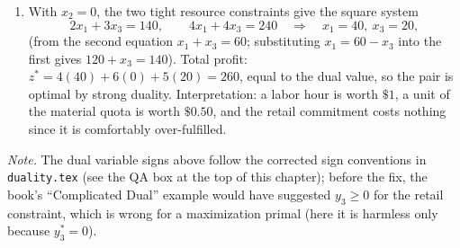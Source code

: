 \begin{enumerate}
\begin{itemize}
\end{itemize}
\item With $x_2 = 0$, the two tight resource constraints give the square system
\[
2x_1 + 3x_3 = 140, \qquad 4x_1 + 4x_3 = 240
\quad\Longrightarrow\quad x_1 = 40, \ x_3 = 20,
\]
(from the second equation $x_1 + x_3 = 60$; substituting $x_1 = 60 - x_3$ into the first gives $120 + x_3 = 140$). Total profit: $z^* = 4(40) + 6(0) + 5(20) = 260$, equal to the dual value, so the pair is optimal by strong duality. Interpretation: a labor hour is worth $\$1$, a unit of the material quota is worth $\$0.50$, and the retail commitment costs nothing since it is comfortably over-fulfilled.
\end{enumerate}

\emph{Note.} The dual variable signs above follow the corrected sign conventions in \texttt{duality.tex} (see the QA box at the top of this chapter); before the fix, the book's ``Complicated Dual'' example would have suggested $y_3 \ge 0$ for the retail constraint, which is wrong for a maximization primal (here it is harmless only because $y_3^* = 0$).
